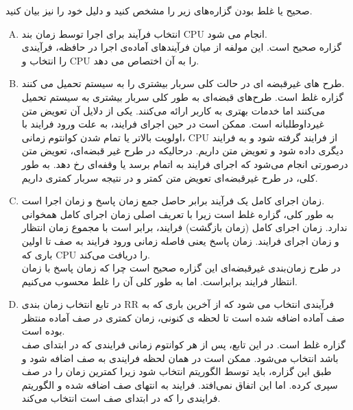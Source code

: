 \documentclass[]{article}
\begin{document}
صحیح یا غلط بودن  گزاره‌های زیر را مشخص کنید و دلیل خود را نیز بیان کنید.
\vspace{0.2cm}
\begin{enumerate}[(A)]
      \item {انتخاب فرآیند برای اجرا توسط زمان بند CPU انجام می شود.}
            \\ گزاره صحیح است. این مولفه از میان فرآیندهای آماده‌ی اجرا در حافظه، فرآیندی را انتخاب و CPU را به آن اختصاص می دهد.

      \item {طرح های غیرقبضه ای در حالت کلی سربار بیشتری را به سیستم تحمیل می کنند.}
            \\ گزاره غلط است. طرح‌های قبضه‌ای به طور کلی سربار بیشتری به سیستم تحمیل می‌کنند اما خدمات بهتری به کاربر ارائه می‌کنند.
            یکی از دلایل آن تعویض متن غیرداوطلبانه است. ممکن است در حین اجرای فرایند، به علت ورود فرایند با اولویت بالاتر یا تمام شدن کوانتوم زمانی،
            CPU از فرایند گرفته شود و به فرایند دیگری داده شود و تعویض متن داریم.
            درحالیکه در طرح غیر قبضه‌ای، تعویض متن درصورتی انجام می‌‌شود که اجرای فرایند به اتمام برسد یا وقفه‌ای رخ دهد.
            به طور کلی، در طرح غیرقبضه‌ای تعویض متن کمتر و در نتیجه سربار کمتری داریم.

      \item  زمان اجرای کامل یک فرآیند برابر حاصل جمع زمان پاسخ و زمان اجرا است.
            \\ به طور کلی، گزاره غلط است زیرا با تعریف اصلی زمان اجرای کامل همخوانی ندارد.
            زمان اجرای کامل (زمان بازگشت) فرایند، برابر است با مجموع زمان انتظار و زمان اجرای فرایند.
            زمان پاسخ یعنی فاصله زمانی ورود فرایند به صف تا اولین باری که CPU را دریافت می‌کند.
            \\
            در طرح زمان‌بندی غیرقبضه‌ای این گزاره صحیح است چرا که زمان پاسخ با زمان انتظار فرایند برابراست.
            اما به طور کلی آن را غلط محسوب می‌کنیم.

      \item در تابع انتخاب زمان بندی RR فرآیندی انتخاب می شود که از آخرین باری که به صف آماده اضافه شده است تا لحظه ی کنونی،
            زمان کمتری در صف آماده منتظر بوده است.
            \\ گزاره غلط است. در این تابع، پس از هر کوانتوم زمانی فرایندی که در ابتدای صف باشد انتخاب می‌شود.
            ممکن است در همان لحظه فرایندی به صف اضافه شود و طبق این گزاره، باید توسط الگوریتم انتخاب شود زیرا کمترین زمان را در صف سپری کرده.
            اما این اتفاق نمی‌افتد. فرایند به انتهای صف اضافه شده و الگوریتم فرایندی را که در ابتدای صف است انتخاب می‌کند.


\end{enumerate}
\end{document}
